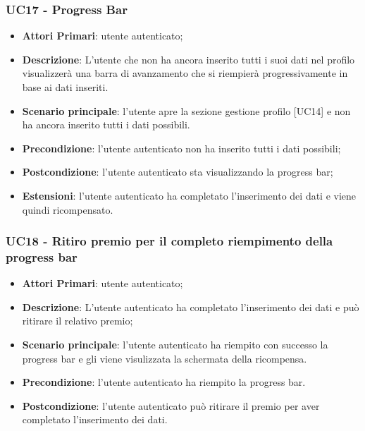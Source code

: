 \subsubsection{UC17 - Progress Bar}
\begin{itemize}
	\item \textbf{Attori Primari}: utente autenticato;
	\item \textbf{Descrizione}: L'utente che non ha ancora inserito tutti i suoi dati nel profilo visualizzerà una barra di avanzamento che si riempierà progressivamente in base ai dati inseriti.
	\item \textbf{Scenario principale}: l'utente apre la sezione gestione profilo [UC14] e non ha ancora inserito tutti i dati possibili.
	\item \textbf{Precondizione}: l'utente autenticato non ha inserito tutti i dati possibili;
	\item \textbf{Postcondizione}: l'utente autenticato sta visualizzando la progress bar;
	\item \textbf{Estensioni}:
			l'utente autenticato ha completato l'inserimento dei dati e viene quindi ricompensato.
\end{itemize}

\subsubsection{UC18 - Ritiro premio per il completo riempimento della progress bar }
\begin{itemize}
	\item \textbf{Attori Primari}: utente autenticato;
	\item \textbf{Descrizione}: L'utente autenticato ha completato l'inserimento dei dati e può ritirare il relativo premio;	
	\item \textbf{Scenario principale}: l'utente autenticato ha riempito con successo la progress bar e gli viene visulizzata la schermata della ricompensa.
	\item \textbf{Precondizione}: l'utente autenticato ha riempito la progress bar.
	\item \textbf{Postcondizione}: l'utente autenticato può ritirare il premio per aver completato l'inserimento dei dati.
\end{itemize}

